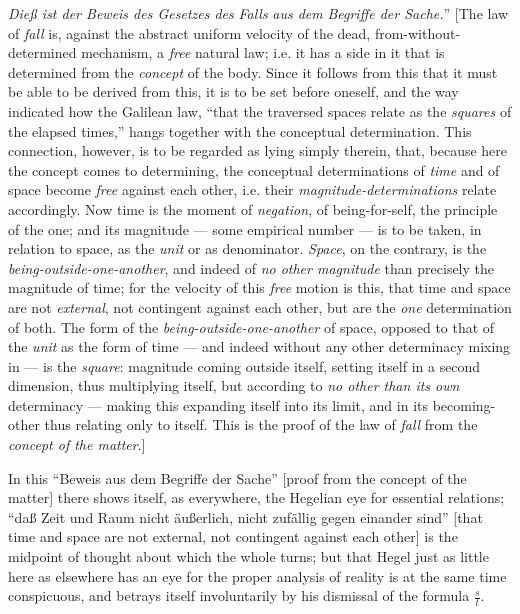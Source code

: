 \documentclass[12pt]{book}
\begin{document}
\textit{Dieß ist der Beweis des Gesetzes des} \emph{Falls} \textit{aus dem} \emph{Begriffe der Sache}\textit{.}''
[The law of \emph{fall} is, against the abstract uniform velocity of the dead, from-without-determined
mechanism, a \emph{free} natural law; i.e. it has a side in it that is determined from the \emph{concept}
of the body. Since it follows from this that it must be able to be derived from this, it is to be set
before oneself, and the way indicated how the Galilean law, ``that the traversed spaces relate as the
\emph{squares} of the elapsed times,'' hangs together with the conceptual determination. This connection,
however, is to be regarded as lying simply therein, that, because here the concept comes to determining,
the conceptual determinations of \emph{time} and of space become \emph{free} against each other, i.e.
their \emph{magnitude-determinations} relate accordingly. Now time is the moment of \emph{negation}, of
being-for-self, the principle of the one; and its magnitude --- some empirical number --- is to be taken,
in relation to space, as the \emph{unit} or as denominator. \emph{Space}, on the contrary, is the
\emph{being-outside-one-another}, and indeed of \emph{no other magnitude} than precisely the magnitude of
time; for the velocity of this \emph{free} motion is this, that time and space are not \emph{external},
not contingent against each other, but are the \emph{one} determination of both. The form of the
\emph{being-outside-one-another} of space, opposed to that of the \emph{unit} as the form of time --- and
indeed without any other determinacy mixing in --- is the \emph{square}: magnitude coming outside itself,
setting itself in a second dimension, thus multiplying itself, but according to \emph{no other than its
own} determinacy --- making this expanding itself into its limit, and in its becoming-other thus relating
only to itself. This is the proof of the law of \emph{fall} from the \emph{concept of the matter}.]

In this ``Beweis aus dem Begriffe der Sache'' [proof from the concept of the matter] there shows itself,
as everywhere, the Hegelian eye for essential relations; ``daß Zeit und Raum nicht äußerlich, nicht
zufällig gegen einander sind'' [that time and space are not external, not contingent against each other]
is the midpoint of thought about which the whole turns; but that Hegel just as little here as elsewhere
has an eye for the proper analysis of reality is at the same time conspicuous, and betrays itself
involuntarily by his dismissal of the formula $\frac{s}{t}$.
\end{document}
